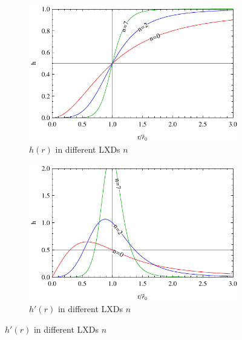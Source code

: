 \documentclass[12pt,a4paper]{report}
\numberwithin{equation}{chapter}
\begin{document}
\begin{appendices}
\begin{figure}
\centering
\begin{subfigure}{0.5\textwidth}
\caption{$h(r)$ in different LXDs $n$}
\label{fig:profile-h}%
\includegraphics[width=\textwidth]{figures/profile-h.pdf}
\end{subfigure}%
\begin{subfigure}{0.5\textwidth}
\caption{$h'(r)$ in different LXDs $n$}
\label{fig:apx-dirac-h}%
\includegraphics[width=\textwidth]{figures/dirac-profile-h.pdf}
\end{subfigure}%


\end{figure}
\end{appendices}
\end{document}
